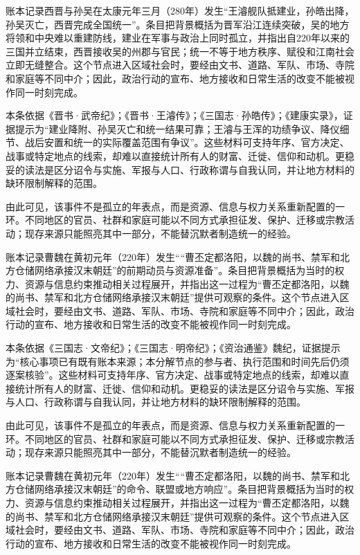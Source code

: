 账本记录西晋与孙吴在太康元年三月（280年）发生“王濬舰队抵建业，孙皓出降，孙吴灭亡，西晋完成全国统一”。条目把背景概括为晋军沿江连续突破，吴的地方将领和中央难以重建防线，建业在军事与政治上同时孤立，并指出自220年以来的三国并立结束，西晋接收吴的州郡与官民；统一不等于地方秩序、赋役和江南社会立即无缝整合。这个节点进入区域社会时，要经由文书、道路、军队、市场、寺院和家庭等不同中介；因此，政治行动的宣布、地方接收和日常生活的改变不能被视作同一时刻完成。

本条依据《晋书·武帝纪》；《晋书·王濬传》；《三国志·孙皓传》；《建康实录》，证据提示为“建业降附、孙吴灭亡和统一结果可靠；王濬与王浑的功绩争议、降仪细节、战后安置和统一的实际覆盖范围有争议”。这些材料可支持年序、官方决定、战事或特定地点的线索，却难以直接统计所有人的财富、迁徙、信仰和动机。更稳妥的读法是区分诏令与实施、军报与人口、行政称谓与自我认同，并让地方材料的缺环限制解释的范围。

由此可见，该事件不是孤立的年表点，而是资源、信息与权力关系重新配置的一环。不同地区的官员、社群和家庭可能以不同方式承担征发、保护、迁移或宗教活动；现存来源只能照亮其中一部分，不能替沉默者制造统一的经验。

账本记录曹魏在黄初元年（220年）发生““曹丕定都洛阳，以魏的尚书、禁军和北方仓储网络承接汉末朝廷”的前期动员与资源准备”。条目把背景概括为当时的权力、资源与信息约束推动相关过程展开，并指出这一过程为“曹丕定都洛阳，以魏的尚书、禁军和北方仓储网络承接汉末朝廷”提供可观察的条件。这个节点进入区域社会时，要经由文书、道路、军队、市场、寺院和家庭等不同中介；因此，政治行动的宣布、地方接收和日常生活的改变不能被视作同一时刻完成。

本条依据《三国志·文帝纪》；《三国志·明帝纪》；《资治通鉴》魏纪，证据提示为“核心事项已有既有账本来源；本分解节点的参与者、执行范围和时间先后仍须逐案核验”。这些材料可支持年序、官方决定、战事或特定地点的线索，却难以直接统计所有人的财富、迁徙、信仰和动机。更稳妥的读法是区分诏令与实施、军报与人口、行政称谓与自我认同，并让地方材料的缺环限制解释的范围。

由此可见，该事件不是孤立的年表点，而是资源、信息与权力关系重新配置的一环。不同地区的官员、社群和家庭可能以不同方式承担征发、保护、迁移或宗教活动；现存来源只能照亮其中一部分，不能替沉默者制造统一的经验。

账本记录曹魏在黄初元年（220年）发生““曹丕定都洛阳，以魏的尚书、禁军和北方仓储网络承接汉末朝廷”的命令、联盟或地方响应”。条目把背景概括为当时的权力、资源与信息约束推动相关过程展开，并指出这一过程为“曹丕定都洛阳，以魏的尚书、禁军和北方仓储网络承接汉末朝廷”提供可观察的条件。这个节点进入区域社会时，要经由文书、道路、军队、市场、寺院和家庭等不同中介；因此，政治行动的宣布、地方接收和日常生活的改变不能被视作同一时刻完成。

